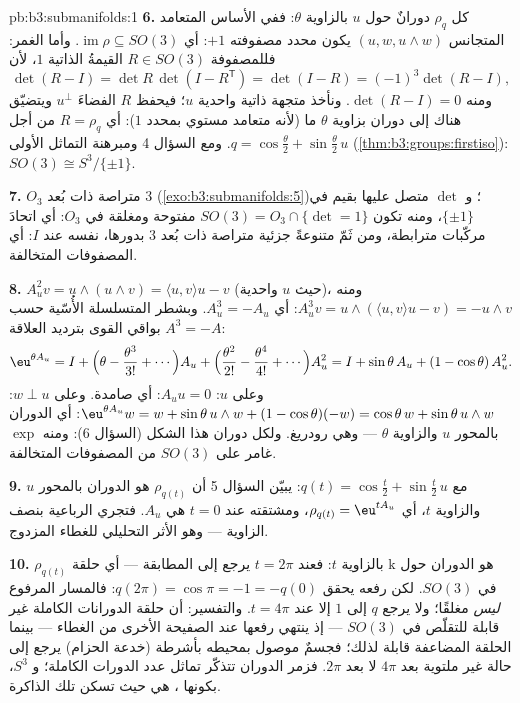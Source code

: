 \begin{solution}{pb:b3:submanifolds:1}
\textbf{6.} كل $\rho_q$ دورانٌ حول $u$ بالزاوية $\theta$: ففي
الأساس المتعامد المتجانس $(u, w, u\wedge w)$ يكون محدد مصفوفته $+1$: أي
$\operatorname{im}\rho \subseteq
SO(3)$. وأما الغمر: فللمصفوفة $R \in SO(3)$ القيمةُ الذاتية
$1$، لأن
\[
\det(R - I) = \det R\,\det(I - R^{\mathsf T}) = \det(I - R)
= (-1)^3\det(R - I),
\]
ومنه $\det(R - I) = 0$. ونأخذ متجهة ذاتية واحدية $u$؛ فيحفظ $R$ الفضاءَ
$u^\perp$ ويتضيّق هناك إلى دوران بزاوية $\theta$ ما (لأنه
متعامد مستوي بمحدد $1$): أي $R = \rho_q$ من أجل $q = \cos\frac\theta2 +
\sin\frac\theta2\,u$. ومع
السؤال 4 ومبرهنة التماثل الأولى (\cref{thm:b3:groups:firstiso}): $SO(3)
\cong S^3/\{\pm1\}$.

\textbf{7.} $O_3$  متراصة ذات بُعد $3$
(\cref{exo:b3:submanifolds:5})؛ و $\det$ متصل عليها بقيم في $\{\pm1\}$، ومنه
تكون $SO(3) = O_3\cap\{\det = 1\}$ مفتوحة ومغلقة في $O_3$: أي اتحادَ مركّبات مترابطة،
ومن ثَمّ متنوعةً جزئية متراصة ذات بُعد $3$ بدورها،  نفسه عند $I$: أي المصفوفات المتخالفة.

\textbf{8.} $A_u^2v = u\wedge(u\wedge v) = \langle u,
v\rangle u - v$ (حيث $u$ واحدية)، ومنه $A_u^3v = u\wedge(\langle
u,v\rangle u - v) = -u\wedge v$: أي
$A_u^3 = -A_u$. وبشطر المتسلسلة الأُسّية حسب بواقي القوى بترديد
العلاقة $A^3 = -A$:
\[
\eu^{\theta A_u} = I + \Bigl(\theta - \frac{\theta^3}{3!} +
\cdots\Bigr)A_u + \Bigl(\frac{\theta^2}{2!} -
\frac{\theta^4}{4!} + \cdots\Bigr)A_u^2
= I + \sin\theta\,A_u + (1 - \cos\theta)\,A_u^2 .
\]
وعلى $u$: $A_uu = 0$: أي صامدة. وعلى $w \perp u$: $\eu^{\theta
A_u}w = w + \sin\theta\,u\wedge w + (1 - \cos\theta)(-w) =
\cos\theta\,w + \sin\theta\,u\wedge w$: أي
الدوران بالمحور $u$ والزاوية $\theta$ --- وهي رودريغ. ولكل
دوران هذا الشكل (السؤال 6): ومنه $\exp$ غامر على $SO(3)$ من
المصفوفات المتخالفة.

\textbf{9.} مع $q(t) = \cos\frac t2 + \sin\frac t2\,u$: يبيّن السؤال 5 أن $\rho_{q(t)}$ هو
الدوران بالمحور $u$ والزاوية $t$، أي $\rho_{q(t)} = \eu^{tA_u}$، ومشتقته عند
$t = 0$ هي $A_u$. فتجري الرباعية بنصف الزاوية --- وهو الأثر
التحليلي للغطاء المزدوج.

\textbf{10.} $\rho_{q(t)}$ هو الدوران حول $\mathrm k$ بالزاوية
$t$: فعند $t = 2\pi$ يرجع إلى المطابقة --- أي حلقة في $SO(3)$.
لكن رفعه يحقق $q(2\pi) = \cos\pi =
-1 = -q(0)$: فالمسار المرفوع \emph{ليس} مغلقًا؛ ولا
يرجع $q$ إلى $1$ إلا عند $t = 4\pi$. والتفسير: أن حلقة
الدورانات الكاملة غير قابلة للتقلّص في $SO(3)$ --- إذ ينتهي
رفعها عند الصفيحة الأخرى من الغطاء --- بينما الحلقة المضاعفة
قابلة لذلك؛ فجسمٌ موصول بمحيطه بأشرطة (خدعة الحزام) يرجع إلى
حالة غير ملتوية بعد $4\pi$ لا بعد $2\pi$. فزمر الدوران تتذكّر
تماثل عدد الدورات الكاملة؛ و $S^3$، بكونها ، هي
حيث تسكن تلك الذاكرة.


\end{solution}
